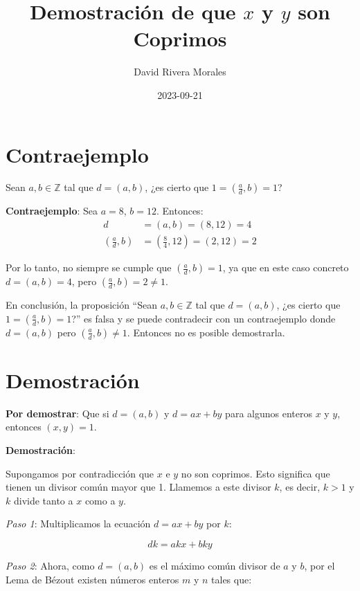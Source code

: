 \documentclass{article}
\begin{document}
\title{Demostración de que \( x \) y \( y \) son Coprimos}
\author{David Rivera Morales}
\date{2023-09-21}
\maketitle

\section*{Contraejemplo}

Sean \( a, b \in \mathbb{Z} \) tal que \( d = (a, b) \), ¿es cierto que \( 1 = \left(\frac{a}{d}, b\right) = 1 \)?

\textbf{Contraejemplo}: Sea \( a = 8 \), \( b = 12 \). Entonces:
\begin{align*}
d &= (a, b) = (8, 12) = 4 \\
\left(\frac{a}{d}, b\right) &= \left(\frac{8}{4}, 12\right) = (2, 12) = 2
\end{align*}

Por lo tanto, no siempre se cumple que \( \left(\frac{a}{d}, b\right) = 1 \), ya que en este caso concreto \( d = (a, b) = 4 \), pero \( \left(\frac{a}{d}, b\right) = 2 \neq 1 \).

En conclusión, la proposición ``Sean \( a, b \in \mathbb{Z} \) tal que \( d = (a, b) \), ¿es cierto que \( 1 = \left(\frac{a}{d}, b\right) = 1 \)?'' es falsa y se puede contradecir con un contraejemplo donde \( d = (a, b) \) pero \( \left(\frac{a}{d}, b\right) \neq 1 \). Entonces no es posible demostrarla.

\section*{Demostración}

\textbf{Por demostrar}: Que si \( d = (a, b) \) y \( d = ax + by \) para algunos enteros \( x \) y \( y \), entonces \( (x, y) = 1 \).

\textbf{Demostración}:

Supongamos por contradicción que \( x \) e \( y \) no son coprimos. Esto significa que tienen un divisor común mayor que 1. Llamemos a este divisor \( k \), es decir, \( k > 1 \) y \( k \) divide tanto a \( x \) como a \( y \).

\textit{Paso 1}: Multiplicamos la ecuación \( d = ax + by \) por \( k \):

\[ dk = akx + bky \]

\textit{Paso 2}: Ahora, como \( d = (a, b) \) es el máximo común divisor de \( a \) y \( b \), por el Lema de Bézout existen números enteros \( m \) y \( n \) tales que:
\end{document}
